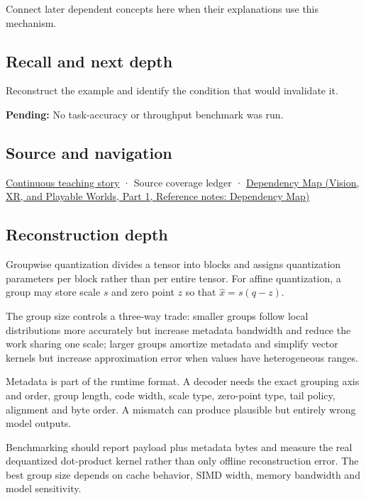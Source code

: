 \hypertarget{appendix-638204c40e8b-used-by}{}

Connect later dependent concepts here when their explanations use this mechanism.

\subsection{Recall and next depth}\label{appendix-638204c40e8b-recall-and-next-depth}

\hypertarget{appendix-638204c40e8b-recall-and-next-depth}{}

Reconstruct the example and identify the condition that would invalidate it.

\textbf{Pending:} No task-accuracy or throughput benchmark was run.

\subsection{Source and navigation}\label{appendix-638204c40e8b-source-and-navigation}

\hypertarget{appendix-638204c40e8b-source-and-navigation}{}

\hyperref[01-foundations-i-ch001-choosing-what-information-to-keep]{Continuous teaching story} · {Source coverage ledger} · \href{../07-Vision-XR-and-Playable-Worlds-P01/main.pdf\#appendix-4ad47bdd269a}{Dependency Map (Vision, XR, and Playable Worlds, Part 1, Reference notes: Dependency Map)}

\subsection{Reconstruction depth}\label{appendix-638204c40e8b-reconstruction-depth}

\hypertarget{appendix-638204c40e8b-reconstruction-depth}{}

Groupwise quantization divides a tensor into blocks and assigns quantization parameters per block rather than per entire tensor. For affine quantization, a group may store scale \(s\) and zero point \(z\) so that \(\hat x=s(q-z)\).

The group size controls a three-way trade: smaller groups follow local distributions more accurately but increase metadata bandwidth and reduce the work sharing one scale; larger groups amortize metadata and simplify vector kernels but increase approximation error when values have heterogeneous ranges.

Metadata is part of the runtime format. A decoder needs the exact grouping axis and order, group length, code width, scale type, zero-point type, tail policy, alignment and byte order. A mismatch can produce plausible but entirely wrong model outputs.

Benchmarking should report payload plus metadata bytes and measure the real dequantized dot-product kernel rather than only offline reconstruction error. The best group size depends on cache behavior, SIMD width, memory bandwidth and model sensitivity.
